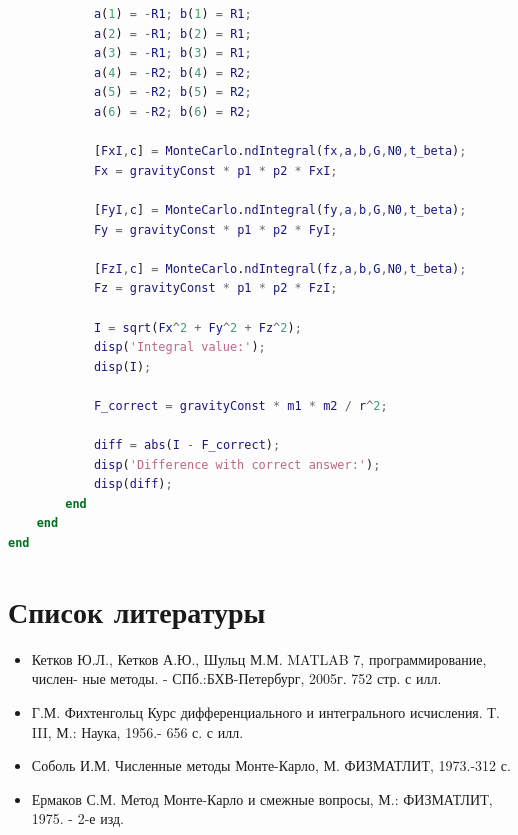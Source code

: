 \documentclass[a4paper,12pt]{article}
\begin{document}
\begin{lstlisting}[language=MATLAB]
            % limitations for every element in x
            a(1) = -R1; b(1) = R1;
            a(2) = -R1; b(2) = R1;
            a(3) = -R1; b(3) = R1;
            a(4) = -R2; b(4) = R2;
            a(5) = -R2; b(5) = R2;
            a(6) = -R2; b(6) = R2;
            
            [FxI,c] = MonteCarlo.ndIntegral(fx,a,b,G,N0,t_beta);
            Fx = gravityConst * p1 * p2 * FxI;
            
            [FyI,c] = MonteCarlo.ndIntegral(fy,a,b,G,N0,t_beta);
            Fy = gravityConst * p1 * p2 * FyI;
            
            [FzI,c] = MonteCarlo.ndIntegral(fz,a,b,G,N0,t_beta);
            Fz = gravityConst * p1 * p2 * FzI;
            
            I = sqrt(Fx^2 + Fy^2 + Fz^2);
            disp('Integral value:');
            disp(I);
                        
            F_correct = gravityConst * m1 * m2 / r^2;
            
            diff = abs(I - F_correct);
            disp('Difference with correct answer:');
            disp(diff);
        end 
    end
end
\end{lstlisting}

\newpage
\section{Список литературы}

\begin{itemize}
	\item Кетков Ю.Л., Кетков А.Ю., Шульц М.М. MATLAB 7, программирование, числен- ные методы. - СПб.:БХВ-Петербург, 2005г. 752 стр. с илл.
	\item Г.М. Фихтенгольц Курс дифференциального и интегрального исчисления. Т. III, М.: Наука, 1956.- 656 с. с илл.
	\item Соболь И.М. Численные методы Монте-Карло, М. ФИЗМАТЛИТ, 1973.-312 с.
	\item Ермаков С.М. Метод Монте-Карло и смежные вопросы, М.: ФИЗМАТЛИТ, 1975. - 2-е изд.
\end{itemize}
\end{document}
